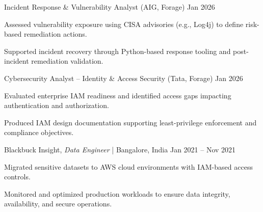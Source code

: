 \begin{cventries2}
  \cventry
    {Incident Response \& Vulnerability Analyst (AIG, Forage)}
    {Jan 2026}
    {
      \begin{cvitems}
        \item {Assessed vulnerability exposure using CISA advisories (e.g., Log4j) to define risk-based remediation actions.}
        \item {Supported incident recovery through Python-based response tooling and post-incident remediation validation.}
      \end{cvitems}
    }
    \vspace{3mm}

  \cventry
    {Cybersecurity Analyst – Identity \& Access Security (Tata, Forage)}
    {Jan 2026}
    {
      \begin{cvitems}
        \item {Evaluated enterprise IAM readiness and identified access gaps impacting authentication and authorization.}
        \item {Produced IAM design documentation supporting least-privilege enforcement and compliance objectives.}
      \end{cvitems}
    }
    \vspace{3mm}

  \cventry
    {Blackbuck Insight, \textnormal{\textit{Data Engineer} | Bangalore, India}}
    {Jan 2021 -- Nov 2021}
    {
      \begin{cvitems}
        \item {Migrated sensitive datasets to AWS cloud environments with IAM-based access controls.}
        \item {Monitored and optimized production workloads to ensure data integrity, availability, and secure operations.}
      \end{cvitems}
    }

\end{cventries2}
\vspace{4mm}


